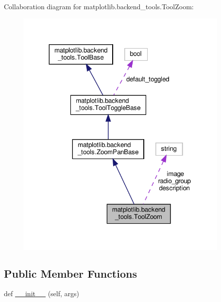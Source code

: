 Collaboration diagram for matplotlib.\+backend\+\_\+tools.\+Tool\+Zoom\+:
\nopagebreak
\begin{figure}[H]
\begin{center}
\leavevmode
\includegraphics[width=299pt]{classmatplotlib_1_1backend__tools_1_1ToolZoom__coll__graph}
\end{center}
\end{figure}
\subsection*{Public Member Functions}
\begin{DoxyCompactItemize}
\item 
def \hyperlink{classmatplotlib_1_1backend__tools_1_1ToolZoom_a121732fe87e26263b61e7db094ad13fb}{\+\_\+\+\_\+init\+\_\+\+\_\+} (self, args)
\end{DoxyCompactItemize}
